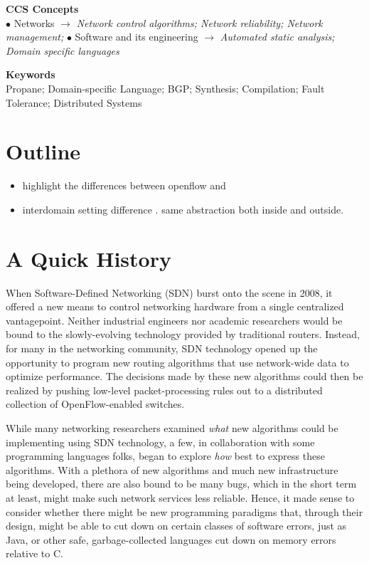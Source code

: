 \documentclass[10pt]{sigalternate052015}
\begin{document}
%
%
%
%


\vspace{0.1in}
\noindent
\textbf{CCS Concepts}\\
$\bullet$ Networks $\rightarrow$ {\em Network control algorithms; Network reliability; Network management;} 
$\bullet$ Software and its engineering $\rightarrow$ {\em Automated static analysis; Domain specific languages}

\vspace{0.1in}
\noindent
\textbf{Keywords}\\
Propane; Domain-specific Language; BGP; Synthesis; Compilation; Fault Tolerance; Distributed Systems


\section{Outline}

\begin{itemize}
\item highlight the differences between openflow and
  \item interdomain setting  difference .  same abstraction both
    inside and outside.
\end{itemize}

\section{A Quick History}

When Software-Defined Networking (SDN) burst onto the scene in 2008,
it offered a new means to control networking hardware from a single
centralized vantagepoint.  Neither industrial engineers nor academic
researchers would be bound to the slowly-evolving technology provided by
traditional routers.  Instead, for many in the networking
community, SDN technology opened up the opportunity to program new
routing algorithms that use network-wide data to optimize performance.
The decisions made by these new algorithms could then be realized by
pushing low-level packet-processing rules out to a distributed
collection of OpenFlow-enabled switches.

While many networking researchers examined \emph{what} new algorithms
could be implementing using SDN technology, a few, in collaboration
with some programming languages folks, began to explore \emph{how}
best to express these algorithms.  With a plethora of new algorithms
and much new infrastructure being developed, there are also bound to
be many bugs, which in the short term at least, might make such network
services less reliable.  Hence, it made sense to consider
whether there might be new programming paradigms that, through their
design, might be able to cut down on certain classes of software
errors, just as Java, or other safe, garbage-collected languages cut
down on memory errors relative to C.
\end{document}
